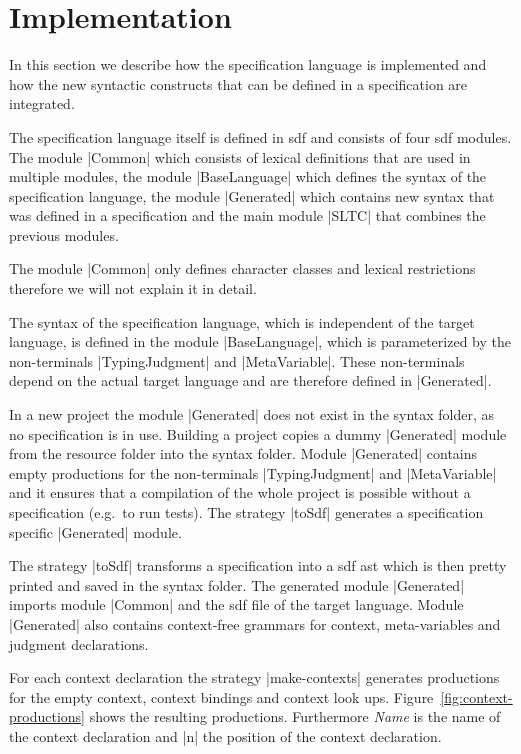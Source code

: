 \section{Implementation}
\label{sec:generate-sdf}
In this section we describe how the specification language is
implemented and how the new syntactic constructs that can be defined
in a specification are integrated.

The specification language itself is defined in \gls{sdf} and consists
of four \gls{sdf} modules. The module \code|Common| which consists of
lexical definitions that are used in multiple modules, the module
\code|BaseLanguage| which defines the syntax of the specification
language, the module \code|Generated| which contains new syntax that
was defined in a specification and the main module \code|SLTC| that
combines the previous modules.

The module \code|Common| only defines character classes and lexical
restrictions therefore we will not explain it in detail.

The syntax of the specification language, which is independent of the
target language, is defined in the module \code|BaseLanguage|, which
is parameterized by the non-terminals \code|TypingJudgment| and
\code|MetaVariable|. These non-terminals depend on the actual target
language and are therefore defined in \code|Generated|.

In a new project the module \code|Generated| does not exist in the
syntax folder, as no specification is in use. Building a project
copies a dummy \code|Generated| module from the resource folder into
the syntax folder. Module \code|Generated| contains empty productions
for the non-terminals \code|TypingJudgment| and \code|MetaVariable|
and it ensures that a compilation of the whole project is possible
without a specification (e.g.\ to run tests). The strategy
\code|toSdf| generates a specification specific \code|Generated|
module.

The strategy \code|toSdf| transforms a specification into a \gls{sdf}
\gls{ast} which is then pretty printed and saved in the syntax
folder. The generated module \code|Generated| imports module
\code|Common| and the \gls{sdf} file of the target language. Module
\code|Generated| also contains context-free grammars for context,
meta-variables and judgment declarations.

For each context declaration the strategy \code|make-contexts|
generates productions for the empty context, context bindings and
context look ups. Figure~\ref{fig:context-productions} shows the
resulting productions. Furthermore \textit{Name} is the name of the
context declaration and \code|n| the position of the context
declaration.

